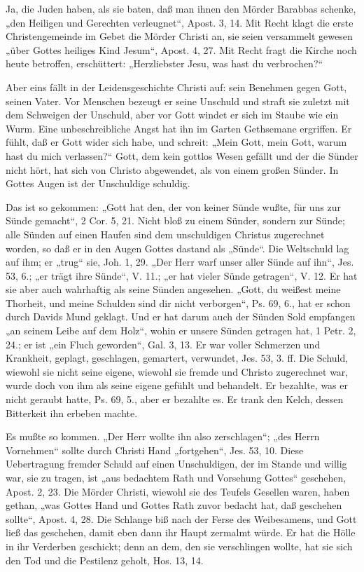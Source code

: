 Ja, die Juden haben, als sie baten, daß man ihnen den Mörder Barabbas schenke, „den Heiligen und Gerechten verleugnet“, Apost. 3, 14. Mit Recht klagt die erste Christengemeinde im Gebet die Mörder Christi an, sie seien versammelt gewesen „über Gottes heiliges Kind Jesum“, Apost. 4, 27. Mit Recht fragt die Kirche noch heute betroffen, erschüttert: „Herzliebster Jesu, was hast du verbrochen?“

Aber eins fällt in der Leidensgeschichte Christi auf: sein Benehmen gegen Gott, seinen Vater. Vor Menschen bezeugt er seine Unschuld und straft sie zuletzt mit dem Schweigen der Unschuld, aber vor Gott windet er sich im Staube wie ein Wurm. Eine unbeschreibliche Angst hat ihn im Garten Gethsemane ergriffen. Er fühlt, daß er Gott wider sich habe, und schreit: „Mein Gott, mein Gott, warum hast du mich verlassen?“ Gott, dem kein gottlos Wesen gefällt und der die Sünder nicht hört, hat sich von Christo abgewendet, als von einem großen Sünder. In Gottes Augen ist der Unschuldige schuldig.

Das ist so gekommen: „Gott hat den, der von keiner Sünde wußte, für uns zur Sünde gemacht“, 2 Cor. 5, 21. Nicht bloß zu einem Sünder, sondern zur Sünde; alle Sünden auf einen Haufen sind dem unschuldigen Christus zugerechnet worden, so daß er in den Augen Gottes dastand als „Sünde“. Die Weltschuld lag auf ihm; er „trug“ sie, Joh. 1, 29. „Der Herr warf unser aller Sünde auf ihn“, Jes. 53, 6.; „er trägt ihre Sünde“, V. 11.; „er hat vieler Sünde getragen“, V. 12. Er hat sie aber auch wahrhaftig als seine Sünden angesehen. „Gott, du weißest meine Thorheit, und meine Schulden sind dir nicht verborgen“, Ps. 69, 6., hat er schon durch Davids Mund geklagt. Und er hat darum auch der Sünden Sold empfangen „an seinem Leibe auf dem Holz“, wohin er unsere Sünden getragen hat, 1 Petr. 2, 24.; er ist „ein Fluch geworden“, Gal. 3, 13. Er war voller Schmerzen und Krankheit, geplagt, geschlagen, gemartert, verwundet, Jes. 53, 3. ff. Die Schuld, wiewohl sie nicht seine eigene, wiewohl sie fremde und Christo zugerechnet war, wurde doch von ihm als seine eigene gefühlt und behandelt. Er bezahlte, was er nicht geraubt hatte, Ps. 69, 5., aber er bezahlte es. Er trank den Kelch, dessen Bitterkeit ihn erbeben machte.

Es mußte so kommen. „Der Herr wollte ihn also zerschlagen“; „des Herrn Vornehmen“ sollte durch Christi Hand „fortgehen“, Jes. 53, 10. Diese Uebertragung fremder Schuld auf einen Unschuldigen, der im Stande und willig war, sie zu tragen, ist „aus bedachtem Rath und Vorsehung Gottes“ geschehen, Apost. 2, 23. Die Mörder Christi, wiewohl sie des Teufels Gesellen waren, haben gethan, „was Gottes Hand und Gottes Rath zuvor bedacht hat, daß geschehen sollte“, Apost. 4, 28. Die Schlange biß nach der Ferse des Weibesamens, und Gott ließ das geschehen, damit eben dann ihr Haupt zermalmt würde. Er hat die Hölle in ihr Verderben geschickt; denn an dem, den sie verschlingen wollte, hat sie sich den Tod und die Pestilenz geholt, Hos. 13, 14.

